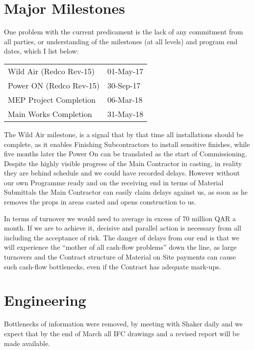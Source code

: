 \section*{Major Milestones}

One problem with the current predicament is the lack of any commitment from all parties, or understanding of the milestones (at all levels) and program end dates, which I list below:
\medskip

\begin{tabular}{ll}
Wild Air (Redco Rev-15) 	                & 01-May-17	\\
Power ON (Redco Rev-15)						 & 30-Sep-17	\\									
MEP Project Completion			             & 06-Mar-18	\\									
Main Works Completion	    	            & 31-May-18	\\									
\end{tabular}

The Wild Air milestone, is a signal that by that time all installations should be complete,  as it enables Finishing Subcontractors to install sensitive finishes, while five months later the Power On can be translated as the start of Commissioning. Despite the highly visible progress of the Main Contractor in casting, in reality they are behind schedule and we could have recorded delays.  However without our own Programme ready and on the receiving end in terms of Material  Submittals the Main Contractor can easily claim delays against us, as soon as he removes the props in areas casted and opens construction to us.

In terms of turnover we would need to average in excess of 70 million QAR a month. If we are to achieve it,  decisive and parallel action is necessary from all including the acceptance of risk. The danger of delays from our end is that we will experience the ``mother of all cash-flow problems'' down the line, as large turnovers and the Contract structure of Material on Site payments can cause such cash-flow bottlenecks, even if the Contract has adequate mark-ups. 

\section*{Engineering}

Bottlenecks of information were removed, by meeting with Shaker daily and we expect that by the end of March all IFC drawings and a revised report will be made available. 

